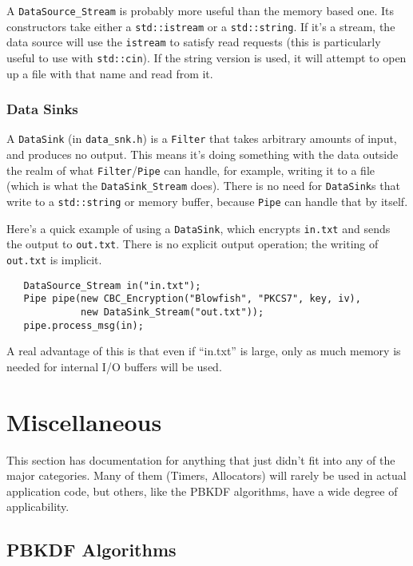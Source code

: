 \documentclass{article}
\newcommand{\filename}[1]{\texttt{#1}}
\newcommand{\type}[1]{\texttt{#1}}
\begin{document}
A \type{DataSource\_Stream} is probably more useful than the memory based
one. Its constructors take either a \type{std::istream} or a
\type{std::string}. If it's a stream, the data source will use the
\type{istream} to satisfy read requests (this is particularly useful to use
with \type{std::cin}). If the string version is used, it will attempt to open
up a file with that name and read from it.

\subsubsection{Data Sinks}

A \type{DataSink} (in \filename{data\_snk.h}) is a \type{Filter} that
takes arbitrary amounts of input, and produces no output. This means
it's doing something with the data outside the realm of what
\type{Filter}/\type{Pipe} can handle, for example, writing it to a
file (which is what the \type{DataSink\_Stream} does). There is no
need for \type{DataSink}s that write to a \type{std::string} or memory
buffer, because \type{Pipe} can handle that by itself.

Here's a quick example of using a \type{DataSink}, which encrypts
\filename{in.txt} and sends the output to \filename{out.txt}. There is
no explicit output operation; the writing of \filename{out.txt} is
implicit.

\begin{verbatim}
   DataSource_Stream in("in.txt");
   Pipe pipe(new CBC_Encryption("Blowfish", "PKCS7", key, iv),
             new DataSink_Stream("out.txt"));
   pipe.process_msg(in);
\end{verbatim}

A real advantage of this is that even if ``in.txt'' is large, only as
much memory is needed for internal I/O buffers will be used.

\section{Miscellaneous}

This section has documentation for anything that just didn't fit into
any of the major categories. Many of them (Timers, Allocators) will
rarely be used in actual application code, but others, like the PBKDF
algorithms, have a wide degree of applicability.

\subsection{PBKDF Algorithms}
\end{document}
